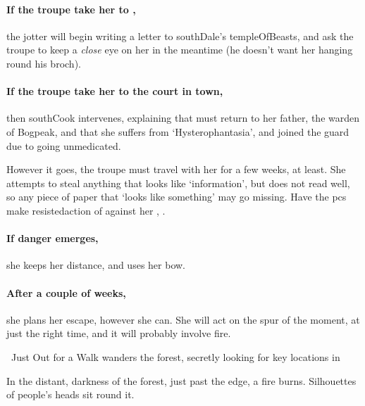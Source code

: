 \southRogue %
\label{southRogue}

\paragraph{If the troupe take her to ,}
the \gls{jotter} will begin writing a letter to \gls{southDale}'s \gls{templeOfBeasts}, and ask the troupe to keep a \textit{close} eye on her in the meantime (he doesn't want her hanging round his \gls{broch}).

\paragraph{If the troupe take her to the \gls{court} in \gls{town},}
then \gls{southCook} intervenes, explaining that  must return to her father, the \gls{warden} of Bogpeak, and that she suffers from `Hysterophantasia', and joined the \gls{guard} due to going unmedicated.

However it goes, the troupe must travel with her for a few weeks, at least.
She attempts to steal anything that looks like `information', but does not read well, so any piece of paper that `looks like something' may go missing.
Have the \glspl{pc} make \gls{resistedaction} of  against her , \tn.

\paragraph{If danger emerges,}
she keeps her distance, and uses her bow.

\paragraph{After a couple of weeks,}
she plans her escape, however she can.
She will act on the spur of the moment, at just the right time, and it will probably involve fire.

{~Just Out for a Walk}%
{ wanders the forest, secretly looking for key locations in }%

\begin{boxtext}
  In the distant, darkness of the forest, just past the \gls{edge}, a fire burns.
  Silhouettes of people's heads sit round it.
\end{boxtext}

